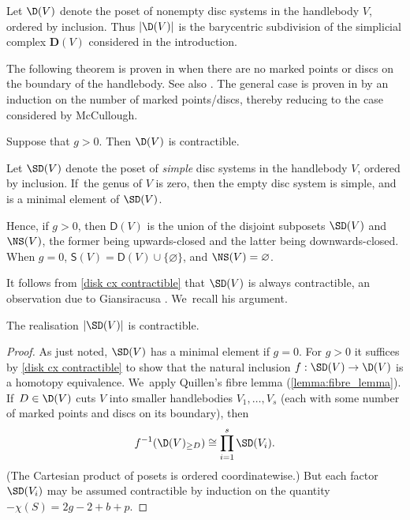 Let $\D(V)$ denote the poset of nonempty disc systems in the handlebody $V$, ordered by inclusion. Thus $|\D(V)|$ is the barycentric subdivision of the simplicial complex $ \mathbf D(V)$ considered in the introduction.

The following theorem is proven in \cite[Th.\,5.3]{mccullough} when there are no marked points or discs on the boundary of the handlebody. See also \cite{cho}. The general case is proven in \cite[Prop.\,8.1]{hatcherwahl} by an induction on the number of marked points/discs, thereby reducing to the case considered by McCullough.

\begin{thm}\label{disk cx contractible}
Suppose that $g>0$. Then $\D(V)$ is contractible.
\end{thm}

\begin{defn}Let
$\SD(V)$ denote the poset of \emph{simple} disc systems in the handlebody $V$, ordered by inclusion. If~the genus of $V$ is zero, then the empty disc system is simple, and is a minimal element of $\SD(V)$.
\end{defn}

Hence, if $g>0$, then $\mathsf D(V)$ is the union of the disjoint subposets $\SD(V)$ and $\NS(V)$, the former being upwards-closed and the latter being downwards-closed. When $g=0$, $\mathsf S(V)=\mathsf D(V) \cup \{\varnothing\}$, and $\NS(V)=\varnothing$.

It follows from \cref{disk cx contractible} that $\SD(V)$ is always contractible, an observation due to Giansiracusa \cite[Prop.\,6.3]{giansiracusa}. We~recall his argument.

\begin{prop}\label{prop: S contractible}
The realisation $|\SD(V)|$ is contractible.
\end{prop}

\begin{proof}
As just noted, $\SD(V)$ has a minimal element if $g=0$. For $g>0$ it suffices by \cref{disk cx contractible} to show that the natural inclusion $f:\SD(V)\to\D(V)$ is a homotopy equivalence. We~apply Quillen's fibre lemma (\ref{lemma:fibre_lemma}). If~$D \in \D(V)$ cuts $V$ into smaller handlebodies $V_1,\dots,V_s$ (each with some number of marked points and discs on its boundary), then
\[
f^{-1}(\D(V)_{\geq D}) \cong \prod_{i=1}^s \SD(V_i).
\](The Cartesian product of posets is ordered coordinatewise.)
But each factor $\SD(V_i)$ may be assumed contractible by induction on the quantity $-\chi(S) = 2g-2+b+p$.
\end{proof}

